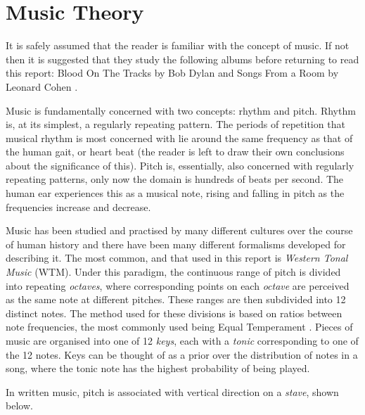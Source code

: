 \documentclass[bsc,singlespacing,logo, parskip, deptreport]{infthesis}
\begin{document}
\section{Music Theory}
It is safely assumed that the reader is familiar with the concept of music. If not then it is suggested that they study the following albums before returning to read this report: Blood On The Tracks by Bob Dylan \cite{dylan1975blood} and Songs From a Room by Leonard Cohen \cite{cohen2007songs}.

Music is fundamentally concerned with two concepts: rhythm and pitch. Rhythm is, at its simplest, a regularly repeating pattern. The periods of repetition that musical rhythm is most concerned with lie around the same frequency as that of the human gait, or heart beat (the reader is left to draw their own conclusions about the significance of this). Pitch is, essentially, also concerned with regularly repeating patterns, only now the domain is hundreds of beats per second. The human ear experiences this as a musical note, rising and falling in pitch as the frequencies increase and decrease.

Music has been studied and practised by many different cultures over the course of human history and there have been many different formalisms developed for describing it. The most common, and that used in this report is {\em Western Tonal Music} (WTM). Under this paradigm, the continuous range of pitch is divided into repeating {\em octaves}, where corresponding points on each {\em octave} are perceived as the same note at different pitches. These ranges are then subdivided into 12 distinct notes. The method used for these divisions is based on ratios between note frequencies, the most commonly used being Equal Temperament \cite{regener1973pitch}. Pieces of music are organised into one of 12 {\em keys}, each with a {\em tonic} corresponding to one of the 12 notes. Keys can be thought of as a prior over the distribution of notes in a song, where the tonic note has the highest probability of being played.

In written music, pitch is associated with vertical direction on a {\em stave}, shown below.
\begin{center}
  {%
\parindent 0pt
\noindent
\ifx\preLilyPondExample \undefined
\else
  \expandafter\preLilyPondExample
\fi
\def\lilypondbook{}%

\ifx\postLilyPondExample \undefined
\else
  \expandafter\postLilyPondExample
\fi
}
\end{center}
\end{document}
